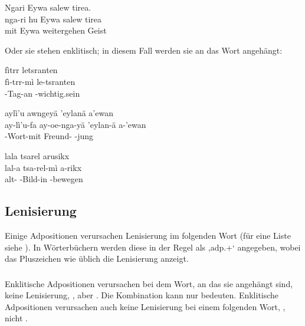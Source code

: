 \begin{interlin}
	\glll \Nfilm{}Ngari  Eywa salew tirea. \\
	nga-ri hu Eywa salew tirea \\
	 mit Eywa weitergehen Geist \\
\end{interlin}

\noindent Oder sie stehen enklitisch; in diesem Fall werden sie an das Wort angehängt:\label{syn:adp:position}

\begin{interlin}
	\glll \Npawl{}fìtrr letsranten \\
	fì-trr-mì le-tsranten \\
	-Tag-an -wichtig.sein \\
\end{interlin}

\begin{interlin}
	\glll \Npawl{}aylì'u awngeyä 'eylanä a'ewan \\
	ay-lì'u-fa ay-oe-nga-yä 'eylan-ä a-'ewan \\
	-Wort-mit  Freund- -jung \\
\end{interlin}

\begin{interlin}
	\glll \Npawl{}lala tsarel arusikx \\
	lal-a tsa-rel-mì a-rikx \\
	alt- -Bild-in -bewegen \\
\end{interlin}

\subsection{Lenisierung} Einige Adpositionen verursachen Lenisierung im folgenden Wort (für eine Liste siehe ). In Wörterbüchern werden diese in der Regel als ,adp.+‘ angegeben, wobei das Pluszeichen wie üblich die Lenisierung anzeigt.

\subsubsection{} Enklitische Adpositionen verursachen bei dem Wort, an das sie angehängt sind, keine Lenisierung,  , aber . Die Kombination  kann nur  bedeuten. Enklitische Adpositionen verursachen auch keine Lenisierung bei einem folgenden Wort,  , nicht .

